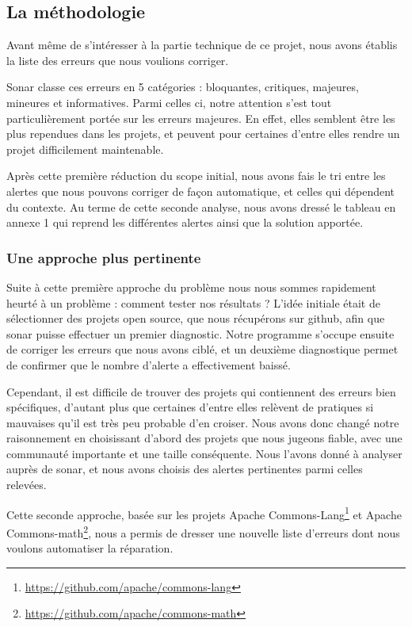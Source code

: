 \documentclass[a4paper]{article}
\begin{document}
\subsection{La méthodologie}
\par Avant même de s'intéresser à la partie technique de ce projet, nous avons établis la liste des erreurs que nous voulions corriger.
\\
\par Sonar classe ces erreurs en 5 catégories : bloquantes, critiques, majeures, mineures et informatives. Parmi celles ci, notre attention s'est tout particulièrement portée sur les erreurs majeures. En effet, elles semblent être les plus rependues dans les projets, et peuvent pour certaines d'entre elles rendre un projet difficilement maintenable.
\\
\par Après cette première réduction du scope initial, nous avons fais le tri entre les alertes que nous pouvons corriger de façon automatique, et celles qui dépendent du contexte. Au terme de cette seconde analyse, nous avons dressé le tableau en annexe 1 qui reprend les différentes alertes ainsi que la solution apportée.

\subsubsection{Une approche plus pertinente}
\par Suite à cette première approche du problème nous nous sommes rapidement heurté à un problème : comment tester nos résultats ? L'idée initiale était de sélectionner des projets open source, que nous récupérons sur github, afin que sonar puisse effectuer un premier diagnostic. Notre programme s'occupe ensuite de corriger les erreurs que nous avons ciblé, et un deuxième diagnostique permet de confirmer que le nombre d'alerte a effectivement baissé. 
\\
\par Cependant, il est difficile de trouver des projets qui contiennent des erreurs bien spécifiques, d'autant plus que certaines d'entre elles relèvent de pratiques si mauvaises qu'il est très peu probable d'en croiser. Nous avons donc changé notre raisonnement en choisissant d'abord des projets que nous jugeons fiable, avec une communauté importante et une taille conséquente. Nous l'avons donné à analyser auprès de sonar, et nous avons choisis des alertes pertinentes parmi celles relevées.
\\
\par Cette seconde approche, basée sur les projets Apache Commons-Lang\footnote{\url{https://github.com/apache/commons-lang}} et Apache Commons-math\footnote{\url{https://github.com/apache/commons-math}}, nous a permis de dresser une nouvelle liste d'erreurs dont nous voulons automatiser la réparation.
\end{document}
